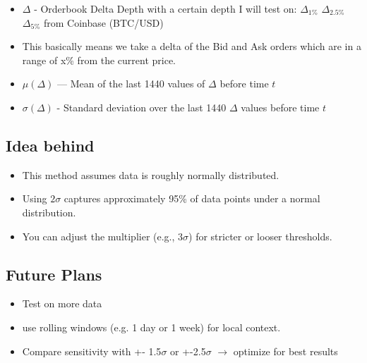 \documentclass[12pt]{article}
\begin{document}
\begin{itemize}
  \item $\Delta$ - Orderbook Delta Depth with a certain depth I will test on: $\Delta_{1\%}$ $\Delta_{2.5\%}$ $\Delta_{5\%}$ from Coinbase (BTC/USD) 
  \item   This basically means we take a delta of the Bid and Ask orders which are in a range of x\% from the current price.
  \item $\mu(\Delta)$ — Mean of the last 1440 values of $\Delta$ before time $t$
  \item $\sigma(\Delta)$ - Standard deviation over the last 1440 $\Delta$ values before time $t$

\end{itemize}










\newpage


\subsection*{Idea behind}

\begin{itemize}
    \item This method assumes data is roughly normally distributed.
    \item Using $2\sigma$ captures approximately 95\% of data points under a normal distribution.
    \item You can adjust the multiplier (e.g., $3\sigma$) for stricter or looser thresholds.
\end{itemize}





\subsection*{Future Plans}

\begin{itemize}
    \item Test on more data
    \item use rolling windows (e.g. 1 day or 1 week) for local context.
    \item Compare sensitivity with +- 1.5$\sigma$ or +-2.5$\sigma$ $\rightarrow$ optimize for best results
\end{itemize}
\end{document}
